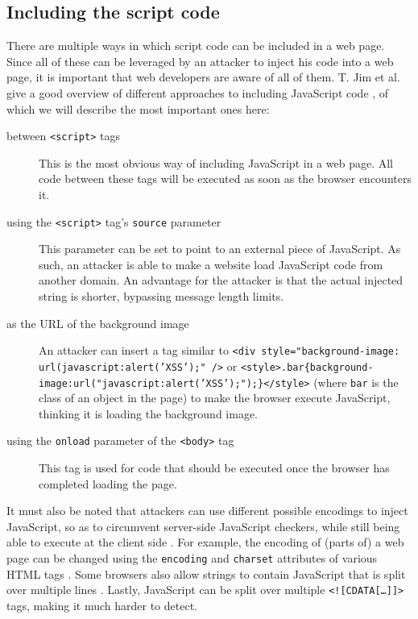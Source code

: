 \subsection{Including the script code}
There are multiple ways in which script code can be included in a web page. Since all of these can be leveraged by an attacker to inject his code into a web page, it is important that web developers are aware of all of them. T. Jim et al. give a good overview of different approaches to including JavaScript code \cite{Jim2007}, of which we will describe the most important ones here:
\begin{description}
	\item[between \texttt{<script>} tags] This is the most obvious way of including JavaScript in a web page. All code between these tags will be executed as soon as the browser encounters it.
	\item[using the \texttt{<script>} tag's \texttt{source} parameter] This parameter can be set to point to an external piece of JavaScript. As such, an attacker is able to make a website load JavaScript code from another domain. An advantage for the attacker is that the actual injected string is shorter, bypassing message length limits.
	\item[as the URL of the background image] An attacker can insert a tag similar to \texttt{<div style="background-image: url(javascript:alert('XSS');" />} or \texttt{<style>.bar\{background-image:url("javascript:alert('XSS');");\}</style>} (where \texttt{bar} is the class of an object in the page) to make the browser execute JavaScript, thinking it is loading the background image.
	\item[using the \texttt{onload} parameter of the \texttt{<body>} tag] This tag is used for code that should be executed once the browser has completed loading the page.
\end{description}

It must also be noted that attackers can use different possible encodings to inject JavaScript, so as to circumvent server-side JavaScript checkers, while still being able to execute at the client side \cite{Jim2007}. For example, the encoding of (parts of) a web page can be changed using the \texttt{encoding} and \texttt{charset} attributes of various HTML tags \cite{Ishida2010}. Some browsers also allow strings to contain JavaScript that is split over multiple lines \cite{Jim2007}. Lastly, JavaScript can be split over multiple  \texttt{<![CDATA[\dots]]>} tags, making it much harder to detect.

